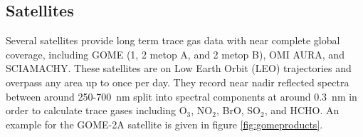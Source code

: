 \subsection{Satellites}

Several satellites provide long term trace gas data with near complete global coverage, including GOME (1, 2 metop A, and 2 metop B), OMI AURA, and SCIAMACHY.
These satellites are on Low Earth Orbit (LEO) trajectories and overpass any area up to once per day. 
They record near nadir reflected spectra between around 250-700~nm split into spectral components at around $0.3$~nm in order to calculate trace gases including O$_3$, NO$_2$, BrO, SO$_2$, and HCHO.
An example for the GOME-2A satellite is given in figure \ref{fig:gomeproducts}.